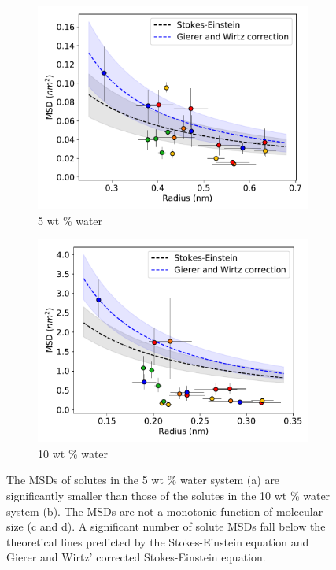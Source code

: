 \documentclass{article}
\begin{document}
\begin{figure}
\begin{subfigure}{0.45\linewidth}
  \includegraphics[width=\linewidth]{msd_radius_5wt.pdf}
  \caption{5 wt \% water}\label{fig:msd_radius_5wt}
  \end{subfigure}
  \begin{subfigure}{0.45\linewidth}
  \includegraphics[width=\linewidth]{msd_radius_10wt.pdf}
  \caption{10 wt \% water}\label{fig:msd_radius_10wt}
  \end{subfigure}
  \caption{The MSDs of solutes in the 5 wt \% water system (a) are significantly
  smaller than those of the solutes in the 10 wt \% water system (b). The
  MSDs are not a monotonic function of molecular size (c and d). A significant
  number of solute MSDs fall below the theoretical lines predicted by the
  Stokes-Einstein equation and Gierer and Wirtz' corrected Stokes-Einstein equation.
  }\label{fig:msds}
  \vspace{-0.4cm}
  \end{figure}
\end{document}

